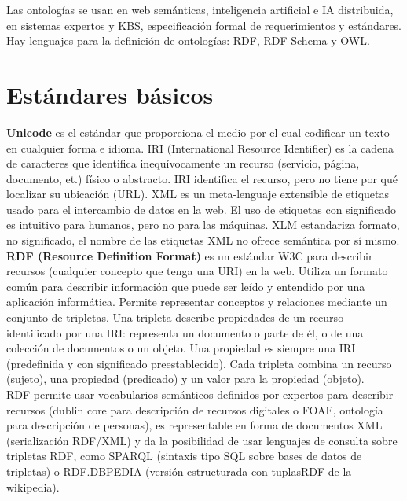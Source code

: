 \documentclass[12pt]{article}
\begin{document}
Las ontologías se usan en web semánticas, inteligencia artificial e IA distribuida, en sistemas expertos y KBS, especificación formal de requerimientos y estándares.\\
Hay lenguajes para la definición de ontologías: RDF, RDF Schema y OWL.

\section{Estándares básicos}
\textbf{Unicode} es el estándar que proporciona el medio por el cual codificar un texto en cualquier forma e idioma. IRI (International Resource Identifier) es la cadena de caracteres que identifica inequívocamente un recurso (servicio, página, documento, et.) físico o abstracto. IRI identifica el recurso, pero no tiene por qué localizar su ubicación (URL). XML es un meta-lenguaje extensible de etiquetas usado para el intercambio de datos en la web. El uso de etiquetas con significado es intuitivo para humanos, pero no para las máquinas. XLM estandariza formato, no significado, el nombre de las etiquetas XML no ofrece semántica por sí mismo.\\

\textbf{RDF (Resource Definition Format)} es un estándar W3C para describir recursos (cualquier concepto que tenga una URI) en la web. Utiliza un formato común para describir información que puede ser leído y entendido por una aplicación informática. Permite representar conceptos y relaciones mediante un conjunto de tripletas. Una tripleta describe propiedades de un recurso identificado por una IRI: representa un documento o parte de él, o de una colección de documentos o un objeto. Una propiedad es siempre una IRI (predefinida y con significado preestablecido). Cada tripleta combina un recurso (sujeto), una propiedad (predicado) y un valor para la propiedad (objeto).\\
RDF permite usar vocabularios semánticos definidos por expertos para describir recursos (dublin core para descripción de recursos digitales o FOAF, ontología para descripción de personas), es representable en forma de documentos XML (serialización RDF/XML) y da la posibilidad de usar lenguajes de consulta sobre tripletas RDF, como SPARQL (sintaxis tipo SQL sobre bases de datos de tripletas) o RDF.DBPEDIA (versión estructurada con tuplasRDF de la wikipedia).\\
\end{document}
